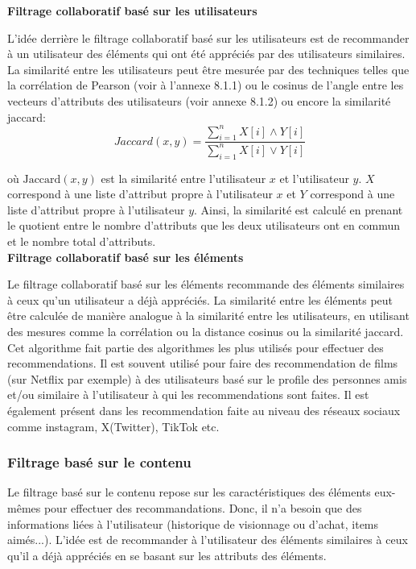 \documentclass[11pt]{article}
\begin{document}
\textbf{Filtrage collaboratif basé sur les utilisateurs}

L'idée derrière le filtrage collaboratif basé sur les utilisateurs est de recommander à un utilisateur des éléments qui ont été appréciés par des utilisateurs similaires. La similarité entre les utilisateurs peut être mesurée par des techniques telles que la corrélation de Pearson (voir à l'annexe 8.1.1) ou le cosinus de l'angle entre les vecteurs d'attributs des utilisateurs (voir annexe 8.1.2) ou encore la similarité jaccard:
\begin{equation}
Jaccard(x, y) = \frac{\sum_{i = 1}^n X[i] \land Y[i]}{\sum_{i = 1}^n X[i] \vee Y[i]}
\end{equation}
\label{jaccard}

où $\text{Jaccard}(x, y)$ est la similarité entre l'utilisateur $x$ et l'utilisateur $y$. $X$ correspond à une liste d'attribut propre à l'utilisateur $x$ et $Y$ correspond à une liste d'attribut propre à l'utilisateur $y$. Ainsi, la similarité est calculé en prenant le quotient entre le nombre d'attributs que les deux utilisateurs ont en commun et le nombre total d'attributs.\\

\textbf{Filtrage collaboratif basé sur les éléments}

Le filtrage collaboratif basé sur les éléments recommande des éléments similaires à ceux qu'un utilisateur a déjà appréciés. La similarité entre les éléments peut être calculée de manière analogue à la similarité entre les utilisateurs, en utilisant des mesures comme la corrélation ou la distance cosinus ou la similarité jaccard.\\

Cet algorithme fait partie des algorithmes les plus utilisés pour effectuer des recommendations. Il est souvent utilisé pour faire des recommendation de films (sur Netflix par exemple) à des utilisateurs basé sur le profile des personnes amis et/ou similaire à l'utilisateur à qui les recommendations sont faites. Il est également présent dans les recommendation faite au niveau des réseaux sociaux comme instagram, X(Twitter), TikTok etc.

\subsubsection{Filtrage basé sur le contenu}
Le filtrage basé sur le contenu repose sur les caractéristiques des éléments eux-mêmes pour effectuer des recommandations. Donc, il n'a besoin que des informations liées à l'utilisateur (historique de visionnage ou d'achat, items aimés...). L'idée est de recommander à l'utilisateur des éléments similaires à ceux qu'il a déjà appréciés en se basant sur les attributs des éléments.
\end{document}
